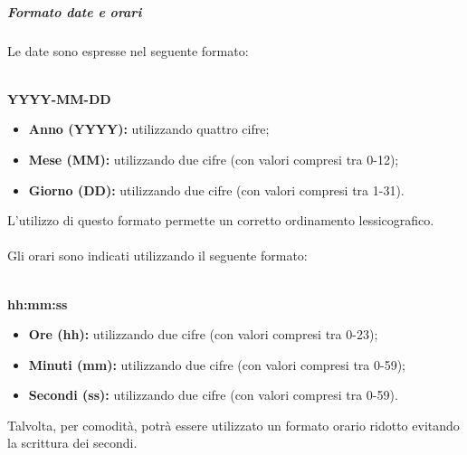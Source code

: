   \subparagraph*{Formato date e orari}
  Le date sono espresse nel seguente formato:\\\\
  \centerline{\textbf{YYYY-MM-DD}}
  \begin{itemize}
  	\item \textbf{Anno (YYYY):} utilizzando quattro cifre;
  	\item \textbf{Mese (MM):} utilizzando due cifre (con valori compresi tra 0-12);
  	\item \textbf{Giorno (DD):} utilizzando due cifre (con valori compresi tra 1-31).
  \end{itemize}
  L'utilizzo di questo formato permette un corretto ordinamento lessicografico.\\\\
  Gli orari sono indicati utilizzando il seguente formato:\\\\
  \centerline{\textbf{hh:mm:ss}}
  \begin{itemize}
  	\item \textbf{Ore (hh):} utilizzando due cifre (con valori compresi tra 0-23);
  	\item \textbf{Minuti (mm):} utilizzando due cifre (con valori compresi tra 0-59);
  	\item \textbf{Secondi (ss):} utilizzando due cifre (con valori compresi tra 0-59).
  \end{itemize}
  Talvolta, per comodità, potrà essere utilizzato un formato orario ridotto evitando la scrittura dei secondi.

